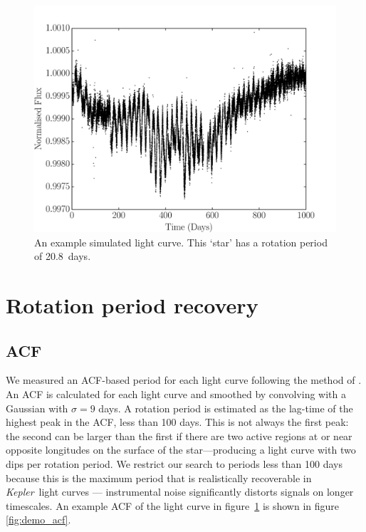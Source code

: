 \documentclass[useAMS, usenatbib, preprint, 12pt]{aastex}
\newcommand{\naigrain}{333}
\newcommand{\aigrainexampleperiod}{20.8}
\newcommand{\Kepler}{{\it Kepler}}
\newcommand{\kepler}{\Kepler}
\begin{document}
\begin{figure}
\begin{center}
\includegraphics[width=6in, clip=true]{figures/demo_lc.pdf}
\caption[A simulated light curve.]
{An example simulated light curve. This `star' has a rotation period of
\aigrainexampleperiod\ days.}
\label{fig:demo_lc}
\end{center}
\end{figure}


\section{Rotation period recovery}
\label{sec:method}
\subsection{ACF}

We measured an ACF-based period for each light curve following the method of
\citet{Mcquillan2013}.
An ACF is calculated for each light curve and smoothed by convolving with a
Gaussian with $\sigma=9$ days.
A rotation period is estimated as the lag-time of the highest peak in the ACF,
less than 100 days.
This is not always the first peak: the second can be larger than the first if
there are two active regions at or near opposite longitudes on the surface of
the star---producing a light curve with two dips per rotation period.
We restrict our search to periods less than 100 days because this is the
maximum period that is realistically recoverable in \kepler\ light curves ---
instrumental noise significantly distorts signals on longer timescales.
An example ACF of the light curve in figure~\ref{fig:demo_lc} is shown
in figure \ref{fig:demo_acf}.
\end{document}
